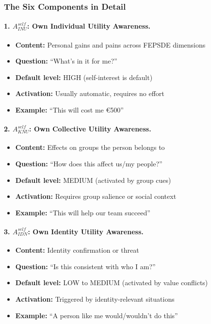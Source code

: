 \subsubsection{The Six Components in Detail}

\paragraph{1. $A^{self}_{INU}$: Own Individual Utility Awareness.}
\begin{itemize}
\item \textbf{Content:} Personal gains and pains across FEPSDE dimensions
\item \textbf{Question:} ``What's in it for me?''
\item \textbf{Default level:} HIGH (self-interest is default)
\item \textbf{Activation:} Usually automatic, requires no effort
\item \textbf{Example:} ``This will cost me \euro{500}''
\end{itemize}

\paragraph{2. $A^{self}_{KNU}$: Own Collective Utility Awareness.}
\begin{itemize}
\item \textbf{Content:} Effects on groups the person belongs to
\item \textbf{Question:} ``How does this affect us/my people?''
\item \textbf{Default level:} MEDIUM (activated by group cues)
\item \textbf{Activation:} Requires group salience or social context
\item \textbf{Example:} ``This will help our team succeed''
\end{itemize}

\paragraph{3. $A^{self}_{IDN}$: Own Identity Utility Awareness.}
\begin{itemize}
\item \textbf{Content:} Identity confirmation or threat
\item \textbf{Question:} ``Is this consistent with who I am?''
\item \textbf{Default level:} LOW to MEDIUM (activated by value conflicts)
\item \textbf{Activation:} Triggered by identity-relevant situations
\item \textbf{Example:} ``A person like me would/wouldn't do this''
\end{itemize}

